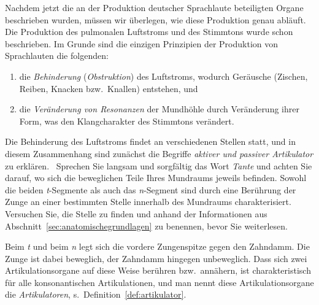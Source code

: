 \label{sec:passiveraktiverartikulator}

Nachdem jetzt die an der Produktion deutscher Sprachlaute beteiligten Organe beschrieben wurden, müssen wir überlegen, wie diese Produktion genau abläuft.
Die Produktion des pulmonalen Luftstroms und des Stimmtons wurde schon beschrieben.
Im Grunde sind die einzigen Prinzipien der Produktion von Sprachlauten die folgenden:

\Np

\begin{enumerate}\Lf
  \item die \textit{Behinderung} (\textit{Obstruktion}) des Luftstroms, wodurch Geräusche (Zischen, Reiben, Knacken bzw.\ Knallen) entstehen, und
  \item die \textit{Veränderung von Resonanzen} der Mundhöhle durch Veränderung ihrer Form, was den Klangcharakter des Stimmtons verändert.
\end{enumerate}

Die Behinderung des Luftstroms findet an verschiedenen Stellen statt, und in diesem Zusammenhang sind zunächst die Begriffe \textit{aktiver und passiver Artikulator} zu erklären.
\TuBegin~Sprechen Sie langsam und sorgfältig das Wort \textit{Tante} und achten Sie darauf, wo sich die beweglichen Teile Ihres Mundraums jeweils befinden.
Sowohl die beiden \textit{t}-Segmente als auch das \textit{n}-Segment sind durch eine Berührung der Zunge an einer bestimmten Stelle innerhalb des Mundraums charakterisiert.
Versuchen Sie, die Stelle zu finden und anhand der Informationen aus Abschnitt~\ref{sec:anatomischegrundlagen} zu benennen, bevor Sie weiterlesen.

Beim \textit{t} und beim \textit{n} legt sich die vordere Zungenspitze gegen den Zahndamm.
Die Zunge ist dabei beweglich, der Zahndamm hingegen unbeweglich.
Dass sich zwei Artikulationsorgane auf diese Weise berühren bzw.\ annähern, ist charakteristisch für alle konsonantischen Artikulationen, und man nennt diese Artikulationsorgane die \textit{Artikulatoren}, s.\ Definition~\ref{def:artikulator}.

\Stretch[0.5]


\Stretch[0.5]

